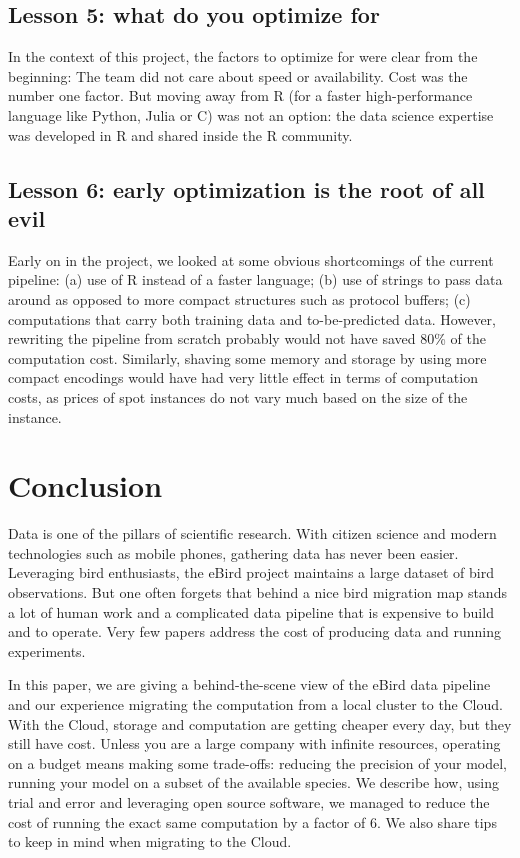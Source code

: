 \documentclass{acm_proc_article-sp}
\begin{document}
\subsection*{Lesson 5: what do you optimize for}
In the context of this project, the factors to optimize for were clear from the beginning:
The team did not care about speed or availability.
Cost was the number one factor.
But moving away from R (for a faster high-performance language like Python, Julia or C) was not an option: the data science expertise was developed in R and shared inside the R community.

\subsection*{Lesson 6: early optimization is the root of all evil}
Early on in the project, we looked at some obvious shortcomings of the current pipeline: (a) use of R instead of a faster language; (b) use of strings to pass data around as opposed to more compact structures such as protocol buffers; (c) computations that carry both training data and to-be-predicted data.
However, rewriting the pipeline from scratch probably would not have saved 80\% of the computation cost. Similarly, shaving some memory and storage by using more compact encodings would have had very little effect in terms of computation costs, as prices of spot instances  do not vary much based on the size of the instance.

\section{Conclusion}\label{sec::conclusion}
Data is one of the pillars of scientific research. With citizen science and modern technologies such as mobile phones, gathering data has never been easier. Leveraging bird enthusiasts, the eBird project maintains a large dataset of bird observations. But one often forgets that behind a nice bird migration map stands a lot of human work and a complicated data pipeline that is expensive to build and to operate. Very few papers address the cost of producing data and running experiments.

In this paper, we are giving a behind-the-scene view of the eBird data pipeline and our experience migrating the computation from a local cluster to the Cloud. With the Cloud, storage and computation are getting cheaper every day, but they still have cost. Unless you are a large company with infinite resources, operating on a budget means making some trade-offs: reducing the precision of your model, running your model on a subset of the available species.
We describe how, using trial and error and leveraging open source software, we managed to reduce the cost of running the exact same computation by a factor of 6. We also share tips to keep in mind when migrating to the Cloud.
\end{document}
